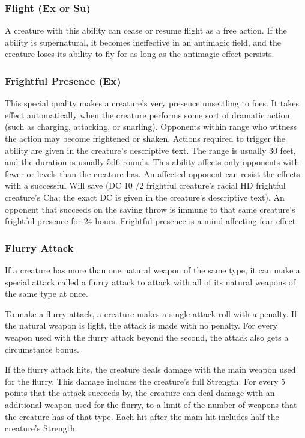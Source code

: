 {\subsubsection{Flight (Ex or Su)} A creature with this ability can cease or resume flight as a free action. If the ability is supernatural, it becomes ineffective in an antimagic field, and the creature loses its ability to fly for as long as the antimagic effect persists.

\subsubsection{Frightful Presence (Ex)} This special quality makes a creature's very presence unsettling to foes. It takes effect automatically when the creature performs some sort of dramatic action (such as charging, attacking, or snarling). Opponents within range who witness the action may become frightened or shaken. Actions required to trigger the ability are given in the creature's descriptive text. The range is usually 30 feet, and the duration is usually 5d6 rounds. This ability affects only opponents with fewer  or levels than the creature has. An affected opponent can resist the effects with a successful Will save (DC 10 /2 frightful creature's racial HD \add frightful creature's Cha; the exact DC is given in the creature's descriptive text). An opponent that succeeds on the saving throw is immune to that same creature's frightful presence for 24 hours. Frightful presence is a mind-affecting fear effect. 


\subsubsection{Flurry Attack} If a creature has more than one natural weapon of the same type, it can make a special attack called a flurry attack to attack with all of its natural weapons of the same type at once.

To make a flurry attack, a creature makes a single attack roll with a  penalty. If the natural weapon is light, the attack is made with no penalty. For every weapon used with the flurry attack beyond the second, the attack also gets a  circumstance bonus.

If the flurry attack hits, the creature deals damage with the main weapon used for the flurry. This damage includes the creature's full Strength. For every 5 points that the attack succeeds by, the creature can deal damage with an additional weapon used for the flurry, to a limit of the number of weapons that the creature has of that type. Each hit after the main hit includes half the creature's Strength.

}
